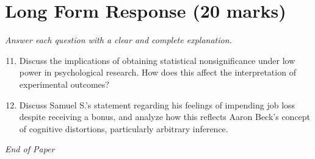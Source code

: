 \documentclass[12pt]{article}
\begin{document}
\section*{Long Form Response (20 marks)}
\textit{Answer each question with a clear and complete explanation.}
\begin{enumerate}[label=\arabic*.]
\setcounter{enumi}{10}
\item Discuss the implications of obtaining statistical nonsignificance under low power in psychological research. How does this affect the interpretation of experimental outcomes?
\item Discuss Samuel S.'s statement regarding his feelings of impending job loss despite receiving a bonus, and analyze how this reflects Aaron Beck's concept of cognitive distortions, particularly arbitrary inference.
\end{enumerate}

\vfill
\noindent\textit{End of Paper}
\end{document}
